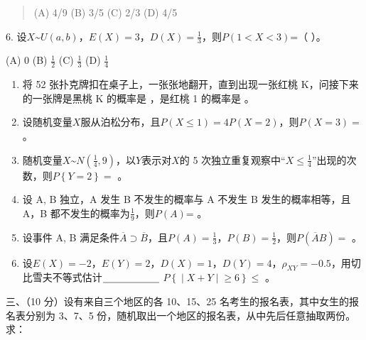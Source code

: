 \documentclass[fontset=exam]{exam-zh}
\begin{document}
\begin{quote}
(A) 4/9 (B) 3/5 (C) 2/3 (D) 4/5
\end{quote}

6. 设\(X\text{\textasciitilde}U\left( {a,b} \right)\)，\(E(X) = 3\)，\(D(X) = \frac{1}{3}\)，则\(P\left( {1 < X < 3} \right)\)=（ ）。

(A) 0 (B) \(\frac{1}{2}\) (C) \(\frac{1}{3}\) (D) \(\frac{1}{4}\)


\par{}\smallskip

\begin{enumerate}
\def\labelenumi{\arabic{enumi}.}
\item
  将 52 张扑克牌扣在桌子上，一张张地翻开，直到出现一张红桃 K，问接下来的一张牌是黑桃 K 的概率是 ，是红桃 1 的概率是 。
\item
  设随机变量\(X\)服从泊松分布，且\(P(X \leq 1) = 4P(X = 2)\)，则\(P(X = 3) =\) 。
\item
  随机变量\(X\text{\textasciitilde}N(\frac{1}{4},9)\)，以\(Y\)表示对\(X\)的 5 次独立重复观察中``\(X \leq \frac{1}{4}\)''出现的次数，则\(P\left\{ Y = 2 \right\} =\) 。
\item
  设 A, B 独立，A 发生 B 不发生的概率与 A 不发生 B 发生的概率相等，且 A，B 都不发生的概率为\(\frac{1}{9}\)，则\(P(A)\text{=}\) 。
\item
  设事件 A, B 满足条件\(\overline{A} \supset \overline{B}\)，且\(P(A) = \frac{1}{3}\text{，}\allowbreak P(B) = \frac{1}{2}\)，则\(P(\overline{A}B) =\) 。
\item
  设\(E(X) = - 2\text{，}\allowbreak E(Y) = 2\text{，}\allowbreak D(X) = 1\text{，}\allowbreak D(Y) = 4\text{，}\allowbreak \rho_{XY} = - 0.5\)，用切比雪夫不等式估计\(\text{\underline{\hspace{2cm}}}\) \(P\left\{ \middle| X + Y \middle| \geq 6 \right\} \leq\) 。
\end{enumerate}


三、（10 分）设有来自三个地区的各 10、15、25 名考生的报名表，其中女生的报名表分别为 3、7、5 份，随机取出一个地区的报名表，从中先后任意抽取两份。求：
\end{document}
